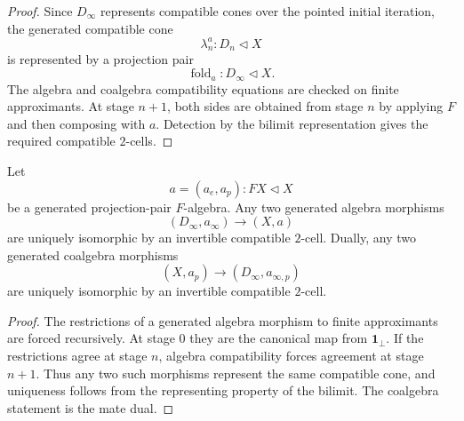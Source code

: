 \begin{proof}
Since \(D_\infty\) represents compatible cones over the pointed initial
iteration, the generated compatible cone
\[
    \lambda^a_n:D_n\triangleleft X
\]
is represented by a projection pair
\[
    \operatorname{fold}_a:D_\infty\triangleleft X.
\]
The algebra and coalgebra compatibility equations are checked on finite
approximants.  At stage \(n+1\), both sides are obtained from stage \(n\) by
applying \(F\) and then composing with \(a\).  Detection by the bilimit
representation gives the required compatible \(2\)-cells.
\end{proof}

\begin{lemma}
\label{lem:uniqueness-generated-folds}
Let
\[
    a=(a_e,a_p):FX\triangleleft X
\]
be a generated projection-pair \(F\)-algebra.  Any two generated algebra
morphisms
\[
    (D_\infty,a_\infty)\to(X,a)
\]
are uniquely isomorphic by an invertible compatible \(2\)-cell.  Dually, any
two generated coalgebra morphisms
\[
    (X,a_p)\to(D_\infty,a_{\infty,p})
\]
are uniquely isomorphic by an invertible compatible \(2\)-cell.
\end{lemma}

\begin{proof}
The restrictions of a generated algebra morphism to finite approximants are
forced recursively.  At stage \(0\) they are the canonical map from
\(\mathbf 1_\bot\).  If the restrictions agree at stage \(n\), algebra
compatibility forces agreement at stage \(n+1\).  Thus any two such morphisms
represent the same compatible cone, and uniqueness follows from the
representing property of the bilimit.  The coalgebra statement is the mate
dual.
\end{proof}

